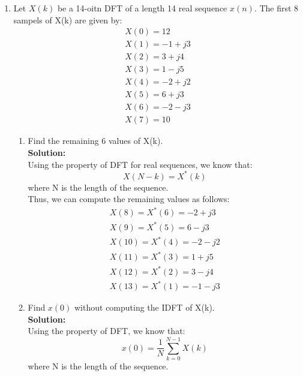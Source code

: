 \documentclass[12pt]{article}
\begin{document}
\begin{enumerate}
		\textbf{Solution:} \\
	The DTFT of a signal is given by:


	\begin{equation}
		Y_1(e^{j\omega}) = \sum_{n=-\infty}^{\infty} y_1[n] e^{-j\omega n}
	\end{equation}

	\item Let $X(k)$ be a 14-oitn DFT of a length 14 real sequence $x(n)$. The first 8 sampels of X(k) are given by:
		\begin{align}
			X(0) = 12 \\
			X(1) = -1 + j3 \\
			X(2) = 3 + j4 \\
			X(3) = 1 - j5 \\
			X(4) = -2 + j2 \\
			X(5) = 6 + j3 \\
			X(6) = -2 - j3 \\
			X(7) = 10
		\end{align}
		\begin{enumerate}
			\item Find the remaining 6 values of X(k). \\
				\textbf{Solution:} \\
				Using the property of DFT for real sequences, we know that:
				\begin{equation}
					X(N-k) = X^*(k)
				\end{equation}
				where N is the length of the sequence. \\
				Thus, we can compute the remaining values as follows:
				\begin{align}
					X(8) = X^*(6) = -2 + j3 \\
					X(9) = X^*(5) = 6 - j3 \\
					X(10) = X^*(4) = -2 - j2 \\
					X(11) = X^*(3) = 1 + j5 \\
					X(12) = X^*(2) = 3 - j4 \\
					X(13) = X^*(1) = -1 - j3
				\end{align}
			\item Find $x(0)$ without computing the IDFT of X(k). \\
				\textbf{Solution:} \\
				Using the property of DFT, we know that:
				\begin{equation}
					x(0) = \frac{1}{N} \sum_{k=0}^{N-1} X(k)
				\end{equation}
				where N is the length of the sequence. \\

\end{enumerate}
\end{enumerate}
\end{document}
